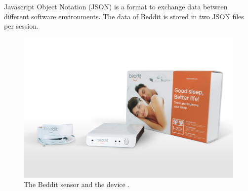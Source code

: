 			Javascript Object Notation (JSON) is a format to exchange data between different software environments. The data of Beddit is stored in two JSON files per session.

			\begin{figure}[h]
				\centering
					\includegraphics[scale=0.25]{beddit.jpg}
					
					\caption{The Beddit sensor and the device \cite{beddit}.}

			\end{figure}



